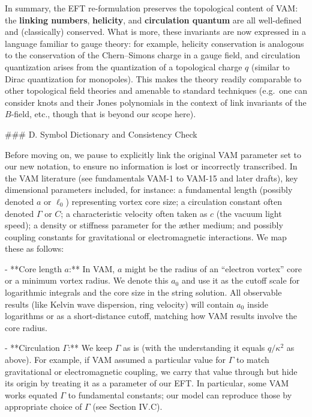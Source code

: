 \documentclass[12pt]{article}
\begin{document}
In summary, the EFT re-formulation preserves the topological content of VAM: the \textbf{linking numbers}, \textbf{helicity}, and \textbf{circulation quantum} are all well-defined and (classically) conserved. What is more, these invariants are now expressed in a language familiar to gauge theory: for example, helicity conservation is analogous to the conservation of the Chern--Simons charge in a gauge field, and circulation quantization arises from the quantization of a topological charge $q$ (similar to Dirac quantization for monopoles). This makes the theory readily comparable to other topological field theories and amenable to standard techniques (e.g.\ one can consider knots and their Jones polynomials in the context of link invariants of the $B$-field, etc., though that is beyond our scope here).

### D. Symbol Dictionary and Consistency Check

Before moving on, we pause to explicitly link the original VAM parameter set to our new notation, to ensure no information is lost or incorrectly transcribed. In the VAM literature (see fundamentals VAM-1 to VAM-15 and later drafts), key dimensional parameters included, for instance: a fundamental length (possibly denoted $a$ or $\ell_0$) representing vortex core size; a circulation constant often denoted $\Gamma$ or $C$; a characteristic velocity often taken as $c$ (the vacuum light speed); a density or stiffness parameter for the æther medium; and possibly coupling constants for gravitational or electromagnetic interactions. We map these as follows: 

- **Core length $a$:** In VAM, $a$ might be the radius of an “electron vortex” core or a minimum vortex radius. We denote this $a_0$ and use it as the cutoff scale for logarithmic integrals and the core size in the string solution. All observable results (like Kelvin wave dispersion, ring velocity) will contain $a_0$ inside logarithms or as a short-distance cutoff, matching how VAM results involve the core radius. 

- **Circulation $\Gamma$:** We keep $\Gamma$ as is (with the understanding it equals $q/\kappa^2$ as above). For example, if VAM assumed a particular value for $\Gamma$ to match gravitational or electromagnetic coupling, we carry that value through but hide its origin by treating it as a parameter of our EFT. In particular, some VAM works equated $\Gamma$ to fundamental constants; our model can reproduce those by appropriate choice of $\Gamma$ (see Section IV.C). 
\end{document}
